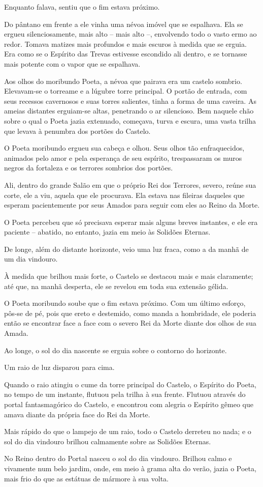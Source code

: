 Enquanto falava, sentiu que o fim estava próximo.

Do pântano em frente a ele vinha uma névoa imóvel que se espalhava. Ela se
ergueu silenciosamente, mais alto -- mais alto --, envolvendo todo o
vasto ermo ao redor. Tomava matizes mais profundos e mais escuros à
medida que se erguia. Era como se o Espírito das Trevas estivesse
escondido ali dentro, e se tornasse mais potente com o vapor que se
espalhava.

Aos olhos do moribundo Poeta, a névoa que pairava era um castelo
sombrio. Elevavam-se o torreame e a lúgubre torre principal. O portão de
entrada, com seus recessos cavernosos e suas torres salientes, tinha a
forma de uma caveira. As ameias distantes erguiam-se altas, penetrando o
ar silencioso. Bem naquele chão sobre o qual o Poeta jazia extenuado,
começava, turva e escura, uma vasta trilha que levava à penumbra dos
portões do Castelo.

O Poeta moribundo ergueu sua cabeça e olhou. Seus olhos tão
enfraquecidos, animados pelo amor e pela esperança de seu espírito,
trespassaram os muros negros da fortaleza e os terrores sombrios dos
portões.



Ali, dentro do grande Salão em que o próprio Rei dos Terrores, severo,
reúne sua corte, ele a viu, aquela que ele procurava. Ela estava nas
fileiras daqueles que esperam pacientemente por seus Amados para seguir
com eles ao Reino da Morte.

O Poeta percebeu que só precisava esperar mais alguns breves instantes,
e ele era paciente -- abatido, no entanto, jazia em meio às Solidões
Eternas.

De longe, além do distante horizonte, veio uma luz fraca, como a da
manhã de um dia vindouro.

À medida que brilhou mais forte, o Castelo se destacou mais e mais
claramente; até que, na manhã desperta, ele se revelou em toda sua
extensão gélida.

O Poeta moribundo soube que o fim estava próximo. Com um último esforço,
pôs-se de pé, pois que ereto e destemido, como manda a hombridade, ele
poderia então se encontrar face a face com o severo Rei da Morte diante
dos olhos de sua Amada.

Ao longe, o sol do dia nascente se erguia sobre o contorno do horizonte.

Um raio de luz disparou para cima.

Quando o raio atingiu o cume da torre principal do Castelo, o Espírito
do Poeta, no tempo de um instante, flutuou pela trilha à sua frente.
Flutuou através do portal fantasmagórico do Castelo, e encontrou com
alegria o Espírito gêmeo que amava diante da própria face do Rei da
Morte.

Mais rápido do que o lampejo de um raio, todo o Castelo derreteu no
nada; e o sol do dia vindouro brilhou calmamente sobre as Solidões
Eternas.

No Reino dentro do Portal nasceu o sol do dia vindouro. Brilhou calmo e
vivamente num belo jardim, onde, em meio à grama alta do verão, jazia o
Poeta, mais frio do que as estátuas de mármore à sua volta.
